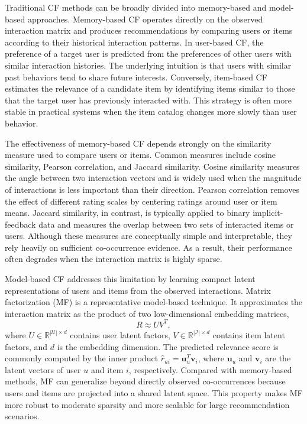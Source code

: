 Traditional CF methods can be broadly divided into memory-based and model-based approaches. Memory-based CF operates directly on the observed interaction matrix and produces recommendations by comparing users or items according to their historical interaction patterns. In user-based CF, the preference of a target user is predicted from the preferences of other users with similar interaction histories. The underlying intuition is that users with similar past behaviors tend to share future interests. Conversely, item-based CF estimates the relevance of a candidate item by identifying items similar to those that the target user has previously interacted with. This strategy is often more stable in practical systems when the item catalog changes more slowly than user behavior.

The effectiveness of memory-based CF depends strongly on the similarity measure used to compare users or items. Common measures include cosine similarity, Pearson correlation, and Jaccard similarity. Cosine similarity measures the angle between two interaction vectors and is widely used when the magnitude of interactions is less important than their direction. Pearson correlation removes the effect of different rating scales by centering ratings around user or item means. Jaccard similarity, in contrast, is typically applied to binary implicit-feedback data and measures the overlap between two sets of interacted items or users. Although these measures are conceptually simple and interpretable, they rely heavily on sufficient co-occurrence evidence. As a result, their performance often degrades when the interaction matrix is highly sparse.

Model-based CF addresses this limitation by learning compact latent representations of users and items from the observed interactions. Matrix factorization (MF) is a representative model-based technique. It approximates the interaction matrix as the product of two low-dimensional embedding matrices,
\begin{equation}
    R \approx U V^{T},
\end{equation}
where \(U \in \mathbb{R}^{|\mathcal{U}| \times d}\) contains user latent factors, \(V \in \mathbb{R}^{|\mathcal{I}| \times d}\) contains item latent factors, and \(d\) is the embedding dimension. The predicted relevance score is commonly computed by the inner product \(\hat{r}_{ui} = \mathbf{u}_{u}^{T}\mathbf{v}_{i}\), where \(\mathbf{u}_{u}\) and \(\mathbf{v}_{i}\) are the latent vectors of user \(u\) and item \(i\), respectively. Compared with memory-based methods, MF can generalize beyond directly observed co-occurrences because users and items are projected into a shared latent space. This property makes MF more robust to moderate sparsity and more scalable for large recommendation scenarios.

